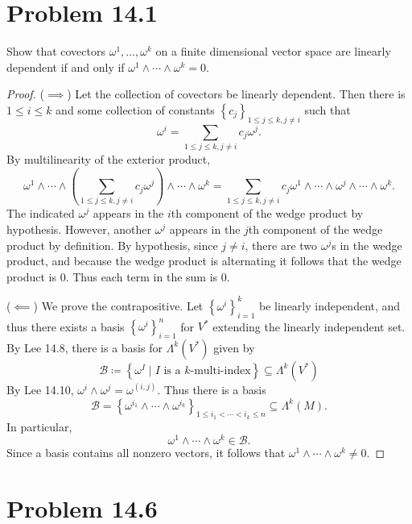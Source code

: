 \documentclass[10pt, letterpaper]{article}
\begin{document}
\section{Problem 14.1}
\begin{problem}
	Show that covectors $\omega ^1, \ldots, \omega ^k$ on a finite dimensional vector space are linearly dependent if and only if $\omega ^1 \wedge \cdots \wedge \omega ^k=0$.
\end{problem}
\begin{proof}
	($\implies $) Let the collection of covectors be linearly dependent. Then there is $1\leq i \leq k$ and some collection of constants $\left\{ c_j \right\}_{1 \leq j \leq k, j \neq i} $ such that
	\[
		\omega ^i = \sum_{1 \leq j \leq k, j\neq i} c_j \omega ^j
	.\]
	By multilinearity of the exterior product,
	\[
		\omega ^1 \wedge \cdots \wedge \left( \sum_{1\leq j\leq k,j\neq i} c_j\omega ^j \right) \wedge \cdots \wedge \omega ^k = \sum_{1\leq j\leq k,j\neq i} c_j \omega ^1 \wedge \cdots \wedge \omega ^j \wedge \cdots \wedge \omega ^k
	.\]
	The indicated $\omega ^j$ appears in the $i$th component of the wedge product by hypothesis. However, another $\omega ^j$ appears in the $j$th component of the wedge product by definition. By hypothesis, since $j\neq i$, there are two $\omega ^j$s in the wedge product, and because the wedge product is alternating it follows that the wedge product is 0. Thus each term in the sum is 0.

	($\impliedby $) We prove the contrapositive. Let $\left\{ \omega ^i \right\}_{i=1} ^k$ be linearly independent, and thus there exists a basis $\left\{ \omega ^i \right\}_{i=1} ^n$ for $V^*$ extending the linearly independent set. By Lee 14.8, there is a basis for $\Lambda ^k(V^*)$ given by
	\[
		\mathcal{B} \coloneqq \left\{ \omega ^I \mid I\text{ is a $k$-multi-index} \right\} \subseteq \Lambda ^k(V^*)
	\]
	By Lee 14.10, $\omega ^i \wedge \omega ^j = \omega ^{(i,j)} $. Thus there is a basis
	\[
		\mathcal{B} = \left\{ \omega^{i_1} \wedge \cdots \wedge \omega ^{i_k} \right\}_{1 \leq i_1 < \cdots < i_k \leq n} \subseteq \Lambda ^k(M)
	.\]
	In particular,
	\[
		\omega ^1 \wedge \cdots \wedge \omega ^k \in \mathcal{B} 
	.\]
	Since a basis contains all nonzero vectors, it follows that $\omega ^1 \wedge\cdots \wedge \omega ^k \neq 0$.
\end{proof}
\section{Problem 14.6}
\end{document}
